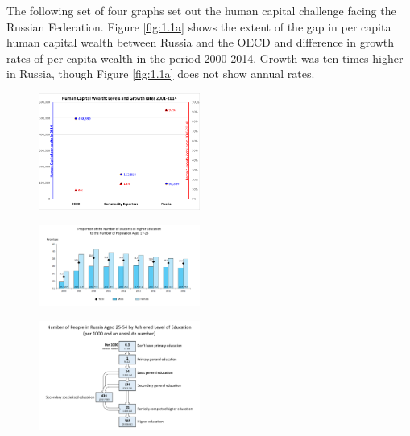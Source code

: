 \documentclass[12pt,a4paper]{article}
\numberwithin{equation}{section}
\begin{document}
The following set of four graphs set out the human capital challenge facing the Russian Federation. Figure \ref{fig:1.1a} shows the extent of the gap in per capita human capital wealth between Russia and the OECD and difference in growth rates of per capita wealth in the period 2000-2014. Growth was ten times higher in Russia, though Figure \ref{fig:1.1a} does not show annual rates. 
\begin{center}
	\begin{figure}[H]
		\begin{minipage}[b]{.5\linewidth}
			\centering
			\hspace*{-0.7in}
			\includegraphics[width=150pt]{graph_1a.png}
			\label{fig:1.1a}
		\end{minipage}
		\hfill
		\begin{minipage}[b]{.5\linewidth}
			\centering
			\hspace*{-0.7in}
			\includegraphics[width=150pt]{graph_1b.png}
			\label{fig:1.1b}
		\end{minipage}
		\hfill
		\begin{minipage}[b]{.5\linewidth}
			\centering
			\hspace*{-0.7in}
			\includegraphics[width=150pt]{graph_1c.png}
			\label{fig:1.1c}

\end{minipage}
\end{figure}
\end{center}
\end{document}
